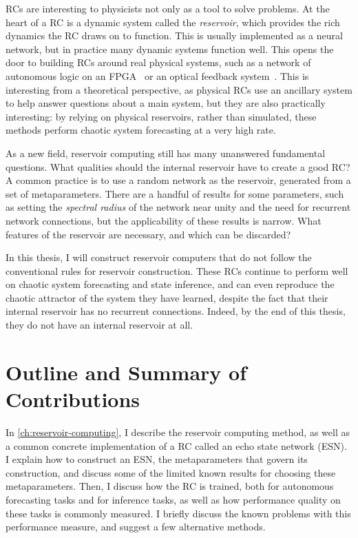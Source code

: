 RCs are interesting to physicists not only as a tool to solve
problems. At the heart of a RC is a dynamic system called the
\emph{reservoir}, which provides the rich dynamics the RC draws on to
function. This is usually implemented as a neural network, but in
practice many dynamic systems function well. This opens the door to
building RCs around real physical systems, such as a network of
autonomous logic on an FPGA~\cite{canaday2018} or an optical feedback
system~\cite{antonik2016}. This is interesting from a theoretical
perspective, as physical RCs use an ancillary system to help answer
questions about a main system, but they are also practically
interesting: by relying on physical reservoirs, rather than simulated,
these methods perform chaotic system forecasting at a very high rate.

As a new field, reservoir computing still has many unanswered
fundamental questions. What qualities should the internal reservoir
have to create a good RC? A common practice is to use a random network
as the reservoir, generated from a set of metaparameters. There are a
handful of results for some parameters, such as setting the
\emph{spectral radius} of the network near unity and the need for
recurrent network connections,\cite{jaeger2001,lukosevicius2012} but
the applicability of these results is narrow. What features of the
reservoir are necessary, and which can be discarded?

In this thesis, I will construct reservoir computers that do not
follow the conventional rules for reservoir construction. These RCs
continue to perform well on chaotic system forecasting and state
inference, and can even reproduce the chaotic attractor of the system
they have learned, despite the fact that their internal reservoir has
no recurrent connections. Indeed, by the end of this thesis, they do
not have an internal reservoir at all.

\section{Outline and Summary of Contributions}

In \cref{ch:reservoir-computing}, I describe the reservoir computing
method, as well as a common concrete implementation of a RC called an
echo state network (ESN). I explain how to construct an ESN, the
metaparameters that govern its construction, and discuss some of the
limited known results for choosing these metaparameters. Then, I
discuss how the RC is trained, both for autonomous forecasting tasks
and for inference tasks, as well as how performance quality on these
tasks is commonly measured. I briefly discuss the known problems with
this performance measure, and suggest a few alternative methods.

